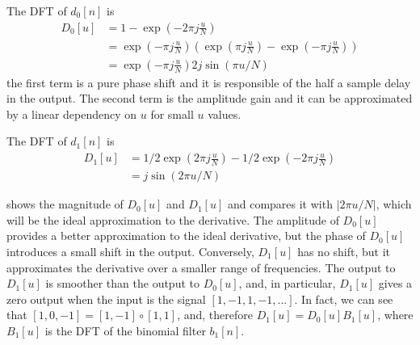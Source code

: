 The DFT of $d_0 \left[n\right]$ is
\begin{equation}
\begin{split}
D_0 \left[u \right] & = 1 - \exp \left( -2 \pi j \frac{u}{N} \right)  \\
& = \exp \left( - \pi j \frac{u}{N} \right) \left(  \exp \left( \pi j \frac{u}{N} \right) - \exp \left( -\pi j \frac{u}{N} \right)  \right) \\
& = \exp \left( - \pi j \frac{u}{N} \right) 2 j \sin (\pi u /N)
\end{split}
\end{equation}
the first term is a pure phase shift and it is responsible of the half a sample delay in the output. The second term is the amplitude gain and it can be approximated by a linear dependency on $u$ for small $u$ values.

The DFT of $d_1 \left[n\right]$ is
\begin{equation}
\begin{split}
D_1 \left[u \right] & =  1/2\exp \left( 2 \pi j \frac{u}{N} \right) - 1/2 \exp \left( -2 \pi j \frac{u}{N} \right)  \\
& =  j \sin (2 \pi u /N)
\end{split}
\end{equation}

\Fig{\ref{fig:d0andd1_dft}} shows the magnitude of $D_0\left[u \right]$ and $D_1\left[u \right]$ and compares it with $\left| 2 \pi u/N \right|$, which will be the ideal approximation to the derivative. The amplitude of $D_0\left[u \right]$ provides a better approximation to the ideal derivative, but the phase of $D_0\left[u \right]$ introduces a small shift in the output. Conversely, $D_1\left[u \right]$ has no shift, but it approximates the derivative over a smaller range of frequencies. The output to $D_1\left[u \right]$ is smoother than the output to $D_0\left[u \right]$, and, in particular, $D_1\left[u \right]$ gives a zero output when the input is the signal $\left[ 1, -1, 1, -1, ... \right]$. In fact, we can see that $\left[1,0,-1\right] = \left[1,-1\right] \circ \left[1,1\right]$, and, therefore $D_1\left[u \right] = D_0\left[u \right] B_1\left[u \right]$, where $B_1\left[u \right]$ is the DFT of the binomial filter $b_1 \left[n \right]$.

